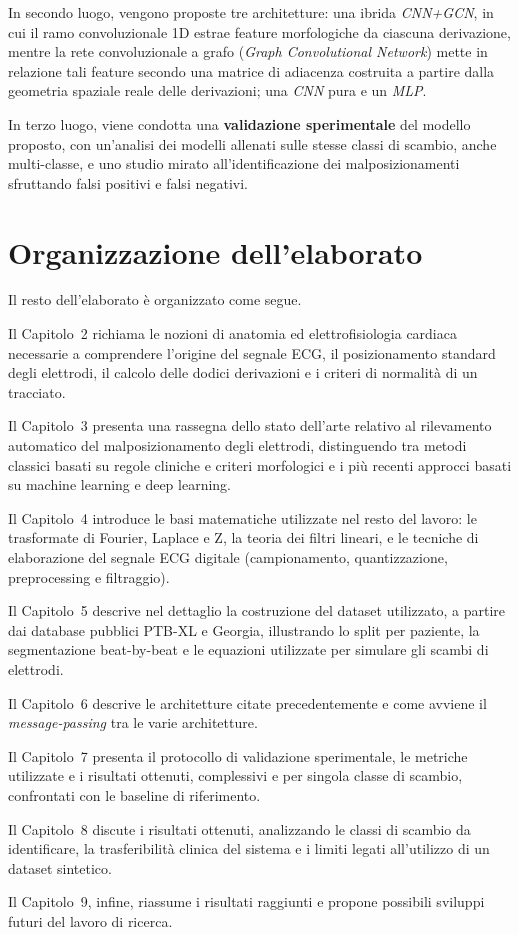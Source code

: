 In secondo luogo, vengono proposte tre architetture: una ibrida \emph{CNN+GCN}, in cui il ramo convoluzionale 1D estrae feature morfologiche da ciascuna derivazione, mentre la rete convoluzionale a grafo (\textit{Graph Convolutional Network}) mette in relazione tali feature secondo una matrice di adiacenza costruita a partire dalla geometria spaziale reale delle derivazioni; una \emph{CNN} pura e un \emph{MLP}.

In terzo luogo, viene condotta una \textbf{validazione sperimentale} del modello proposto, con un'analisi dei modelli allenati sulle stesse classi di scambio, anche multi-classe, e uno studio mirato all'identificazione dei malposizionamenti sfruttando falsi positivi e falsi negativi.

\section*{Organizzazione dell'elaborato}

Il resto dell'elaborato è organizzato come segue.

Il Capitolo~2 richiama le nozioni di anatomia ed elettrofisiologia cardiaca necessarie a comprendere l'origine del segnale ECG, il posizionamento standard degli elettrodi, il calcolo delle dodici derivazioni e i criteri di normalità di un tracciato.

Il Capitolo~3 presenta una rassegna dello stato dell'arte relativo al rilevamento automatico del malposizionamento degli elettrodi, distinguendo tra metodi classici basati su regole cliniche e criteri morfologici e i più recenti approcci basati su machine learning e deep learning.

Il Capitolo~4 introduce le basi matematiche utilizzate nel resto del lavoro: le trasformate di Fourier, Laplace e Z, la teoria dei filtri lineari, e le tecniche di elaborazione del segnale ECG digitale (campionamento, quantizzazione, preprocessing e filtraggio).

Il Capitolo~5 descrive nel dettaglio la costruzione del dataset utilizzato, a partire dai database pubblici PTB-XL e Georgia, illustrando lo split per paziente, la segmentazione beat-by-beat e le equazioni utilizzate per simulare gli scambi di elettrodi.

Il Capitolo~6 descrive le architetture citate precedentemente e come avviene il \emph{message-passing} tra le varie architetture.

Il Capitolo~7 presenta il protocollo di validazione sperimentale, le metriche utilizzate e i risultati ottenuti, complessivi e per singola classe di scambio, confrontati con le baseline di riferimento.

Il Capitolo~8 discute i risultati ottenuti, analizzando le classi di scambio da identificare, la trasferibilità clinica del sistema e i limiti legati all'utilizzo di un dataset sintetico.

Il Capitolo~9, infine, riassume i risultati raggiunti e propone possibili sviluppi futuri del lavoro di ricerca.
